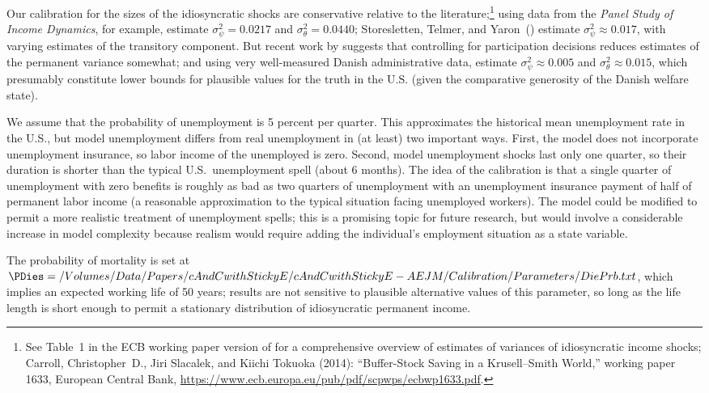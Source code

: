 Our calibration for the sizes of the idiosyncratic shocks are conservative relative to the literature;\footnote{See Table~1 in the ECB working paper version of \cite{cstKS} for a comprehensive overview of estimates of variances of idiosyncratic income shocks; Carroll, Christopher~D., Jiri Slacalek, and Kiichi Tokuoka (2014): ``Buffer-Stock Saving in a Krusell--Smith World,'' working paper 1633, European Central Bank, \url{https://www.ecb.europa.eu/pub/pdf/scpwps/ecbwp1633.pdf}.} using data from the {\it Panel Study of Income Dynamics}, for example, \cite{carroll&samwick:nature} estimate $\sigma_{\psi}^{2} = 0.0217$ and $\sigma_{\theta}^{2} = 0.0440$; Storesletten, Telmer, and Yaron~(\citeyear{sty:consumption}) estimate $\sigma_{\psi}^{2} \approx 0.017$, with varying estimates of the transitory component.  But recent work by \cite{lmpPermShocks} suggests that controlling for participation decisions reduces estimates of the permanent variance somewhat; and using very well-measured Danish administrative data, \cite{nv:risk} estimate $\sigma_{\psi}^{2} \approx 0.005$ and $\sigma_{\theta}^{2} \approx 0.015$, which presumably constitute lower bounds for plausible values for the truth in the U.S. (given the comparative generosity of the Danish welfare state).

We assume that the probability of unemployment is 5 percent per quarter.  This approximates the historical mean unemployment rate in the U.S., but model unemployment differs from real unemployment in (at least) two important ways.  First, the model does not incorporate unemployment insurance, so labor income of the unemployed is zero.  Second, model unemployment shocks last only one quarter, so their duration is shorter than the typical U.S.\ unemployment spell (about 6 months).  The idea of the calibration is that a single quarter of unemployment with zero benefits is roughly as bad as two quarters of unemployment with an unemployment insurance payment of half of permanent labor income (a reasonable approximation to the typical situation facing unemployed workers).  The model could be modified to permit a more realistic treatment of unemployment spells; this is a promising topic for future research, but would involve a considerable increase in model complexity because realism would require adding the individual's employment situation as a state variable.

The probability of mortality is set at $\PDies=  {/Volumes/Data/Papers/cAndCwithStickyE/cAndCwithStickyE-AEJM/Calibration/Parameters/DiePrb.txt}$, which implies an expected working life of 50 years; results are not sensitive to plausible alternative values of this parameter, so long as the life length is short enough to permit a stationary distribution of idiosyncratic permanent income.